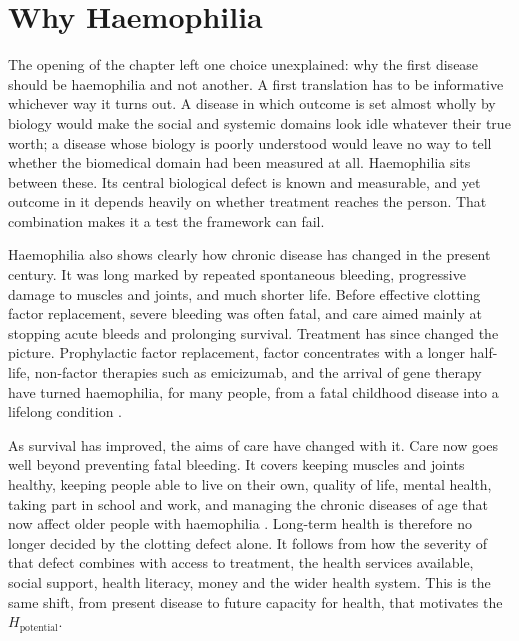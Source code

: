 \section{Why Haemophilia}
\label{sec:why_haemophilia}

\noindent The opening of the chapter left one choice unexplained: why the first disease should be haemophilia and not another. A first translation has to be informative whichever way it turns out. A disease in which outcome is set almost wholly by biology would make the social and systemic domains look idle whatever their true worth; a disease whose biology is poorly understood would leave no way to tell whether the biomedical domain had been measured at all. Haemophilia sits between these. Its central biological defect is known and measurable, and yet outcome in it depends heavily on whether treatment reaches the person. That combination makes it a test the framework can fail.

Haemophilia also shows clearly how chronic disease has changed in the present century. It was long marked by repeated spontaneous bleeding, progressive damage to muscles and joints, and much shorter life. Before effective clotting factor replacement, severe bleeding was often fatal, and care aimed mainly at stopping acute bleeds and prolonging survival. Treatment has since changed the picture. Prophylactic factor replacement, factor concentrates with a longer half-life, non-factor therapies such as emicizumab, and the arrival of gene therapy have turned haemophilia, for many people, from a fatal childhood disease into a lifelong condition \citep{srivastava_2020}.

As survival has improved, the aims of care have changed with it. Care now goes well beyond preventing fatal bleeding. It covers keeping muscles and joints healthy, keeping people able to live on their own, quality of life, mental health, taking part in school and work, and managing the chronic diseases of age that now affect older people with haemophilia \citep{mauser_2009}. Long-term health is therefore no longer decided by the clotting defect alone. It follows from how the severity of that defect combines with access to treatment, the health services available, social support, health literacy, money and the wider health system. This is the same shift, from present disease to future capacity for health, that motivates the $H_{\text{potential}}$.

